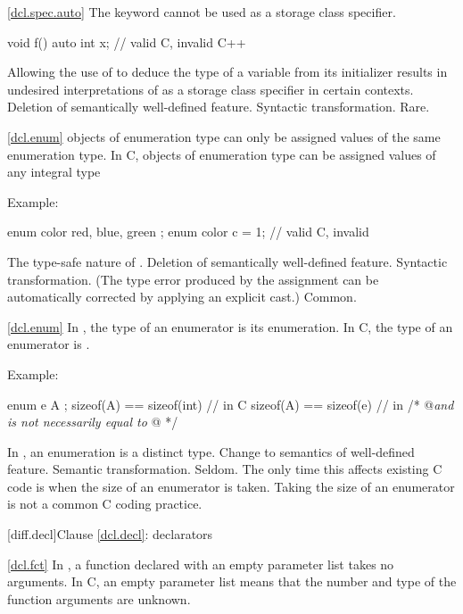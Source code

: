 \ref{dcl.spec.auto}
\change
The keyword  cannot be used as a storage class specifier.

\begin{codeblock}
void f() {
  auto int x;     // valid C, invalid C++
}
\end{codeblock}

\rationale Allowing the use of  to deduce the type
of a variable from its initializer results in undesired interpretations of
 as a storage class specifier in certain contexts.
\effect Deletion of semantically well-defined feature.
\difficulty Syntactic transformation.
\howwide Rare.

\ref{dcl.enum}
\change \Cpp objects of enumeration type can only be assigned values of the same enumeration type.
In C, objects of enumeration type can be assigned values of any integral type

Example:
\begin{codeblock}
enum color { red, blue, green };
enum color c = 1;               // valid C, invalid \Cpp
\end{codeblock}

\rationale
The type-safe nature of \Cpp.
\effect
Deletion of semantically well-defined feature.
\difficulty
Syntactic transformation.
(The type error produced by the assignment can be automatically
corrected by applying an explicit cast.)
\howwide
Common.

\ref{dcl.enum}
\change In \Cpp, the type of an enumerator is its enumeration. In C, the type of an enumerator is .

Example:

\begin{codeblock}
enum e { A };
sizeof(A) == sizeof(int)        // in C
sizeof(A) == sizeof(e)          // in \Cpp
/* @\textit{\textrm{and  is not necessarily equal to }}@ */
\end{codeblock}

\rationale
In \Cpp, an enumeration is a distinct type.
\effect
Change to semantics of well-defined feature.
\difficulty
Semantic transformation.
\howwide
Seldom.
The only time this affects existing C code is when the size of an
enumerator is taken.
Taking the size of an enumerator is not a
common C coding practice.

[diff.decl]{Clause \ref{dcl.decl}: declarators}

\ref{dcl.fct}
\change In \Cpp, a function declared with an empty parameter list takes no arguments.
In C, an empty parameter list means that the number and type of the function arguments are unknown.

